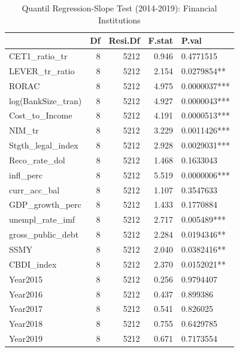 \begin{table}[ht]
\centering
\caption{Quantil Regression-Slope Test (2014-2019): Financial Institutions} 
\begingroup\small
\begin{tabular}{lrrrl}
  \toprule
 & Df & Resi.Df & F.stat & P.val \\ 
  \midrule
CET1\_ratio\_tr & 8 & 5212 & 0.946 & 0.4771515 \\ 
  LEVER\_tr\_ratio & 8 & 5212 & 2.154 & 0.0279854** \\ 
  RORAC & 8 & 5212 & 4.975 & 0.0000037*** \\ 
  log(BankSize\_tran) & 8 & 5212 & 4.927 & 0.0000043*** \\ 
  Cost\_to\_Income & 8 & 5212 & 4.191 & 0.0000513*** \\ 
  NIM\_tr & 8 & 5212 & 3.229 & 0.0011426*** \\ 
  Stgth\_legal\_index & 8 & 5212 & 2.928 & 0.0029031*** \\ 
  Reco\_rate\_dol & 8 & 5212 & 1.468 & 0.1633043 \\ 
  infl\_perc & 8 & 5212 & 5.519 & 0.0000006*** \\ 
  curr\_acc\_bal & 8 & 5212 & 1.107 & 0.3547633 \\ 
  GDP\_growth\_perc & 8 & 5212 & 1.433 & 0.1770884 \\ 
  unempl\_rate\_imf & 8 & 5212 & 2.717 & 0.005489*** \\ 
  gross\_public\_debt & 8 & 5212 & 2.284 & 0.0194346** \\ 
  SSMY & 8 & 5212 & 2.040 & 0.0382416** \\ 
  CBDI\_index & 8 & 5212 & 2.370 & 0.0152021** \\ 
  Year2015 & 8 & 5212 & 0.256 & 0.9794407 \\ 
  Year2016 & 8 & 5212 & 0.437 & 0.899386 \\ 
  Year2017 & 8 & 5212 & 0.541 & 0.826025 \\ 
  Year2018 & 8 & 5212 & 0.755 & 0.6429785 \\ 
  Year2019 & 8 & 5212 & 0.671 & 0.7173554 \\ 
   \bottomrule
\end{tabular}
\endgroup
\end{table}
